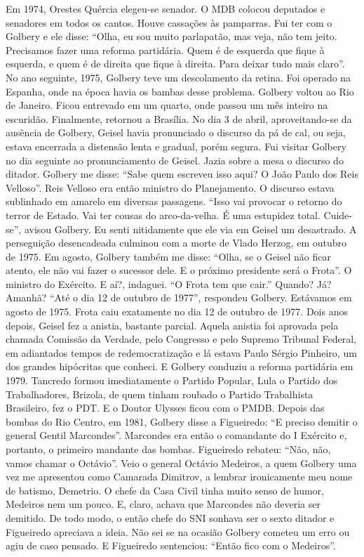 \normalfont 
Em 1974, Orestes Quércia elegeu-se senador. O MDB colocou
deputados e senadores em todos os cantos. Houve cassações às pamparras.
Fui ter com o Golbery e ele disse: ``Olha, eu sou muito parlapatão, mas
veja, não tem jeito. Precisamos fazer uma reforma partidária. Quem é de
esquerda que fique à esquerda, e quem é de direita que fique à direita.
Para deixar tudo mais claro''. No ano seguinte, 1975, Golbery teve um
descolamento da retina. Foi operado na Espanha, onde na época havia os
bambas desse problema. Golbery voltou ao Rio de Janeiro. Ficou entrevado
em um quarto, onde passou um mês inteiro na escuridão. Finalmente,
retornou a Brasília. No dia 3 de abril, aproveitando-se da ausência de
Golbery, Geisel havia pronunciado o discurso da pá de cal, ou seja,
estava encerrada a distensão lenta e gradual, porém segura. Fui visitar
Golbery no dia seguinte ao pronunciamento de Geisel. Jazia sobre a mesa
o discurso do ditador. Golbery me disse: ``Sabe quem escreveu isso aqui?
O João Paulo dos Reis Velloso''. Reis Velloso era então ministro do
Planejamento. O discurso estava sublinhado em amarelo em diversas
passagens. ``Isso vai provocar o retorno do terror de Estado. Vai ter
cousas do arco-da-velha. É uma estupidez total. Cuide-se'', avisou
Golbery. Eu senti nitidamente que ele via em Geisel um desastrado. A
perseguição desencadeada culminou com a morte de Vlado Herzog, em
outubro de 1975. Em agosto, Golbery também me disse: ``Olha, se o Geisel
não ficar atento, ele não vai fazer o sucessor dele. E o próximo
presidente será o Frota''. O ministro do Exército. E aí?, indaguei. ``O
Frota tem que cair.'' Quando? Já? Amanhã? ``Até o dia 12 de outubro de
1977'', respondeu Golbery. Estávamos em agosto de 1975. Frota caiu
exatamente no dia 12 de outubro de 1977. Dois anos depois, Geisel fez a
anistia, bastante parcial. Aquela anistia foi aprovada pela chamada
Comissão da Verdade, pelo Congresso e pelo Supremo Tribunal Federal, em
adiantados tempos de redemocratização e lá estava Paulo Sérgio Pinheiro,
um dos grandes hipócritas que conheci. E Golbery conduziu a reforma
partidária em 1979. Tancredo formou imediatamente o Partido Popular,
Lula o Partido dos Trabalhadores, Brizola, de quem tinham roubado o
Partido Trabalhista Brasileiro, fez o PDT. E o Doutor Ulysses ficou com
o PMDB. Depois das bombas do Rio Centro, em 1981, Golbery disse a
Figueiredo: ``E preciso demitir o general Gentil Marcondes''. Marcondes
era então o comandante do I Exército e, portanto, o primeiro mandante
das bombas. Figueiredo rebateu: ``Não, não, vamos chamar o Octávio''.
Veio o general Octávio Medeiros, a quem Golbery uma vez me apresentou
como Camarada Dimitrov, a lembrar ironicamente meu nome de batismo,
Demetrio. O chefe da Casa Civil tinha muito senso de humor, Medeiros nem
um pouco. E, claro, achava que Marcondes não deveria ser demitido. De
todo modo, o então chefe do SNI sonhava ser o sexto ditador e Figueiredo
apreciava a ideia. Não sei se na ocasião Golbery cometeu um erro ou agiu
de caso pensado. E Figueiredo sentenciou: ``Então fico com o Medeiros''.

